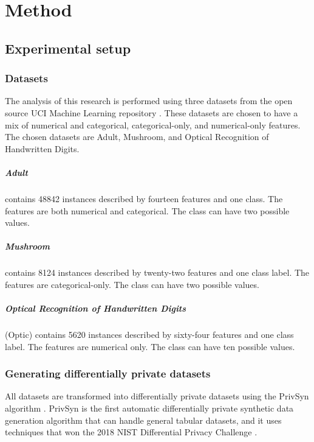 \chapter{Method}
\label{ch:method}

\section{Experimental setup}
\subsection{Datasets}
The analysis of this research is performed using three datasets from the open source UCI Machine Learning repository \cite{datasetsrepo}. These datasets are chosen to have a mix of numerical and categorical, categorical-only, and numerical-only features. The chosen datasets are Adult, Mushroom, and Optical Recognition of Handwritten Digits.

\paragraph{Adult}
contains 48842 instances described by fourteen features and one class. The features are both numerical and categorical. The class can have two possible values.

\paragraph{Mushroom}
contains 8124 instances described by twenty-two features and one class label. The features are categorical-only. The class can have two possible values.

\paragraph{Optical Recognition of Handwritten Digits}
(Optic) contains 5620 instances described by sixty-four features and one class label. The features are numerical only. The class can have ten possible values.

\subsection{Generating differentially private datasets}
All datasets are transformed into differentially private datasets using the PrivSyn algorithm \cite{privsyn}. PrivSyn is the first automatic differentially private synthetic data generation algorithm that can handle general tabular datasets, and it uses techniques that won the 2018 NIST Differential Privacy Challenge \cite{nist2018}.\\

